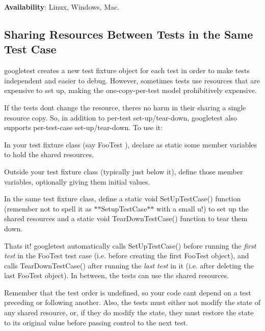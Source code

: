 {\bfseries Availability}\+: Linux, Windows, Mac.

\subsection*{Sharing Resources Between Tests in the Same Test Case}

googletest creates a new test fixture object for each test in order to make tests independent and easier to debug. However, sometimes tests use resources that are expensive to set up, making the one-\/copy-\/per-\/test model prohibitively expensive.

If the tests don\textquotesingle{}t change the resource, there\textquotesingle{}s no harm in their sharing a single resource copy. So, in addition to per-\/test set-\/up/tear-\/down, googletest also supports per-\/test-\/case set-\/up/tear-\/down. To use it\+:


\begin{DoxyEnumerate}
\item In your test fixture class (say {\ttfamily Foo\+Test} ), declare as {\ttfamily static} some member variables to hold the shared resources.
\end{DoxyEnumerate}
\begin{DoxyEnumerate}
\item Outside your test fixture class (typically just below it), define those member variables, optionally giving them initial values.
\end{DoxyEnumerate}
\begin{DoxyEnumerate}
\item In the same test fixture class, define a {\ttfamily static void Set\+Up\+Test\+Case()} function (remember not to spell it as $\ast$$\ast${\ttfamily Setup\+Test\+Case}$\ast$$\ast$ with a small {\ttfamily u}!) to set up the shared resources and a {\ttfamily static void Tear\+Down\+Test\+Case()} function to tear them down.
\end{DoxyEnumerate}

That\textquotesingle{}s it! googletest automatically calls {\ttfamily Set\+Up\+Test\+Case()} before running the {\itshape first test} in the {\ttfamily Foo\+Test} test case (i.\+e. before creating the first {\ttfamily Foo\+Test} object), and calls {\ttfamily Tear\+Down\+Test\+Case()} after running the {\itshape last test} in it (i.\+e. after deleting the last {\ttfamily Foo\+Test} object). In between, the tests can use the shared resources.

Remember that the test order is undefined, so your code can\textquotesingle{}t depend on a test preceding or following another. Also, the tests must either not modify the state of any shared resource, or, if they do modify the state, they must restore the state to its original value before passing control to the next test.

